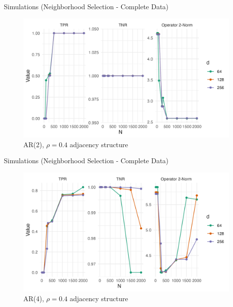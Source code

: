 \documentclass{beamer}
\begin{document}
\begin{frame}{Simulations (Neighborhood Selection - Complete Data)}
    \begin{figure}
        \centering 
        \includegraphics[scale=0.65]{glasso_complete_fixN_b2mb.png}
        \caption{AR(2), $\rho=0.4$ adjacency structure}
    \end{figure}
\end{frame}


\begin{frame}{Simulations (Neighborhood Selection - Complete Data)}
    \begin{figure}
        \centering 
        \includegraphics[scale=0.65]{glasso_complete_fixN_b4mb.png}
        \caption{AR(4), $\rho=0.4$ adjacency structure}
    \end{figure}
\end{frame}
\end{document}

